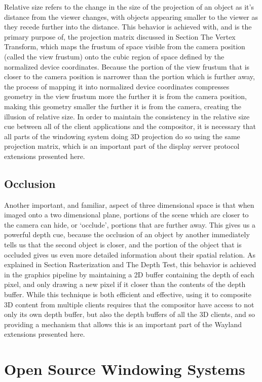 Relative size refers to the change in the size of the projection of an object as it’s distance from the viewer changes, with objects appearing smaller to the viewer as they recede further into the distance. This behavior is achieved with, and is the primary purpose of, the projection matrix discussed in Section {The Vertex Transform}, which maps the frustum of space visible from the camera position (called the view frustum) onto the cubic region of space defined by the normalized device coordinates. Because the portion of the view frustum that is closer to the camera position is narrower than the portion which is further away, the process of mapping it into normalized device coordinates compresses geometry in the view frustum more the further it is from the camera position, making this geometry smaller the further it is from the camera, creating the illusion of relative size. In order to maintain the consistency in the relative size cue between all of the client applications and the compositor, it is necessary that all parts of the windowing system doing 3D projection do so using the same projection matrix, which is an important part of the display server protocol extensions presented here.

\subsection{Occlusion}

Another important, and familiar, aspect of three dimensional space is that when imaged onto a two dimensional plane, portions of the scene which are closer to the camera can hide, or ‘occlude’, portions that are further away. This gives us a powerful depth cue, because the occlusion of an object by another immediately tells us that the second object is closer, and the portion of the object that is occluded gives us even more detailed information about their spatial relation. As explained in Section {Rasterization and The Depth Test}, this behavior is achieved in the graphics pipeline by maintaining a 2D buffer containing the depth of each pixel, and only drawing a new pixel if it closer than the contents of the depth buffer. While this technique is both efficient and effective, using it to composite 3D content from multiple clients requires that the compositor have access to not only its own depth buffer, but also the depth buffers of all the 3D clients, and so providing a mechanism that allows this is an important part of the Wayland extensions presented here. 

\section{Open Source Windowing Systems}

